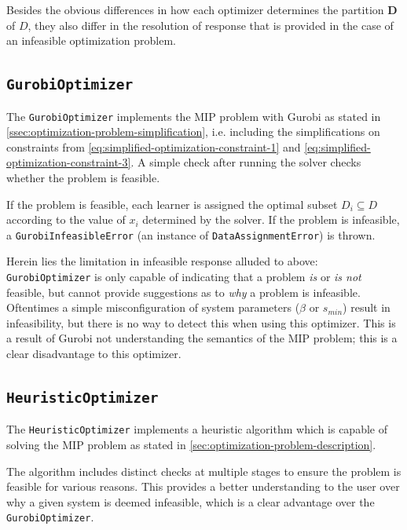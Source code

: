 \documentclass[../mthe-493-final-project.tex]{subfiles}
\begin{document}
    Besides the obvious differences in how each optimizer determines the partition $\boldsymbol{D}$ of $D$, they also differ in the resolution of response that is provided in the case of an infeasible optimization problem.
    
    \subsection{\texttt{GurobiOptimizer}}
    \label{ssec:optimization-gurobi-optimizer-implementation}
    
    The \texttt{GurobiOptimizer} implements the MIP problem with Gurobi as stated in \autoref{ssec:optimization-problem-simplification}, i.e. including the simplifications on constraints from \eqref{eq:simplified-optimization-constraint-1} and \eqref{eq:simplified-optimization-constraint-3}. A simple check after running the solver checks whether the problem is feasible.
    
    If the problem is feasible, each learner is assigned the optimal subset $D_i \subseteq D$ according to the value of $x_i$ determined by the solver. If the problem is infeasible, a \texttt{GurobiInfeasibleError} (an instance of \texttt{DataAssignmentError}) is thrown.
    
    Herein lies the limitation in infeasible response alluded to above: \texttt{GurobiOptimizer} is only capable of indicating that a problem \textit{is} or \textit{is not} feasible, but cannot provide suggestions as to \textit{why} a problem is infeasible. Oftentimes a simple misconfiguration of system parameters ($\beta$ or $s_{min}$) result in infeasibility, but there is no way to detect this when using this optimizer. This is a result of Gurobi not understanding the semantics of the MIP problem; this is a clear disadvantage to this optimizer.
    
    \subsection{\texttt{HeuristicOptimizer}}
    \label{ssec:optimization-heuristic-optimizer-implementation}
    
    The \texttt{HeuristicOptimizer} implements a heuristic algorithm which is capable of solving the MIP problem as stated in \autoref{sec:optimization-problem-description}.
    
    The algorithm includes distinct checks at multiple stages to ensure the problem is feasible for various reasons. This provides a better understanding to the user over why a given system is deemed infeasible, which is a clear advantage over the \texttt{GurobiOptimizer}. 
    
\end{document}
